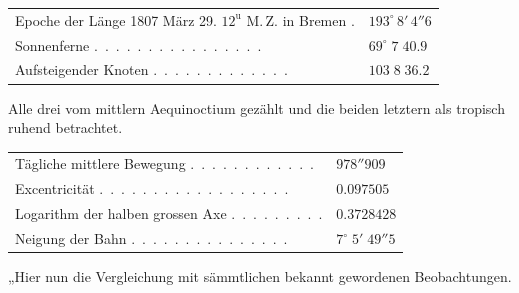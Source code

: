 \begin{center}\begingroup\fontsize{9}{11}\selectfont
\begin{tabular}{ll}
\shortstack[l]{Epoche der Länge 1807 März 29.\\$12^{\text{u}}$ M.\,Z. in Bremen} . & $193^\circ\,8'\,4''6$ \\
Sonnenferne .\ .\ .\ .\ .\ .\ .\ .\ .\ .\ .\ .\ .\ .\ .\ . & $69^\circ\;7\;40.9$ \\
Aufsteigender Knoten .\ .\ .\ .\ .\ .\ .\ .\ .\ .\ .\ .\ . & $103\;8\;36.2$
\end{tabular}\endgroup\end{center}

\noindent Alle drei vom mittlern Aequinoctium gezählt und die beiden letztern als tropisch ruhend betrachtet.

\begin{center}\begingroup\fontsize{9}{11}\selectfont
\begin{tabular}{ll}
Tägliche mittlere Bewegung .\ .\ .\ .\ .\ .\ .\ .\ .\ .\ .\ . & $978''909$ \\
Excentricität .\ .\ .\ .\ .\ .\ .\ .\ .\ .\ .\ .\ .\ .\ .\ .\ .\ . & $0.097505$ \\
Logarithm der halben grossen Axe .\ .\ .\ .\ .\ .\ .\ .\ . & $0.3728428$ \\
Neigung der Bahn .\ .\ .\ .\ .\ .\ .\ .\ .\ .\ .\ .\ .\ .\ . & $7^\circ\;5'\;49''5$
\end{tabular}\endgroup\end{center}

\par\indent „Hier nun die Vergleichung mit sämmtlichen bekannt gewordenen Beobachtungen.

